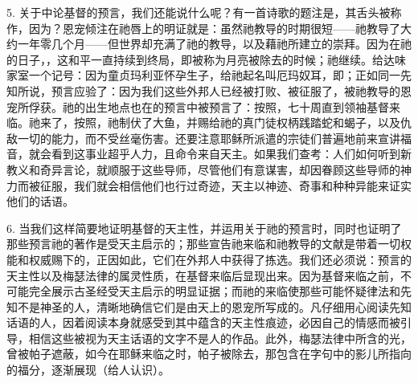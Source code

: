 5. 关于中论基督的预言，我们还能说什么呢？有一首诗歌的题注是，其舌头被称作，因为？恩宠倾注在祂唇上的明证就是：虽然祂教导的时期很短——祂教导了大约一年零几个月——但世界却充满了祂的教导，以及藉祂所建立的崇拜。因为在祂的日子，，这和平一直持续到终局，即被称为月亮被除去的时候；祂继续。给达味家室一个记号：因为童贞玛利亚怀孕生子，给祂起名叫厄玛奴耳，即；正如同一先知所说，预言应验了：因为我们这些外邦人已经被打败、被征服了，被祂教导的恩宠所俘获。祂的出生地点也在的预言中被预言了：按照，七十周直到领袖基督来临。祂来了，按照，祂制伏了大鱼，并赐给祂的真门徒权柄践踏蛇和蝎子，以及仇敌一切的能力，而不受丝毫伤害。还要注意耶稣所派遣的宗徒们普遍地前来宣讲福音，就会看到这事业超乎人力，且命令来自天主。如果我们查考：人们如何听到新教义和奇异言论，就顺服于这些导师，尽管他们有意谋害，却因眷顾这些导师的神力而被征服，我们就会相信他们也行过奇迹，天主以神迹、奇事和种种异能来证实他们的话语。\par

6. 当我们这样简要地证明基督的天主性，并运用关于祂的预言时，同时也证明了那些预言祂的著作是受天主启示的；那些宣告祂来临和祂教导的文献是带着一切权能和权威赐下的，正因如此，它们在外邦人中获得了拣选。我们还必须说：预言的天主性以及梅瑟法律的属灵性质，在基督来临后显现出来。因为基督来临之前，不可能完全展示古圣经受天主启示的明显证据；而祂的来临使那些可能怀疑律法和先知不是神圣的人，清晰地确信它们是由天上的恩宠所写成的。凡仔细用心阅读先知话语的人，因着阅读本身就感受到其中蕴含的天主性痕迹，必因自己的情感而被引导，相信这些被视为天主话语的文字不是人的作品。此外，梅瑟法律中所含的光，曾被帕子遮蔽，如今在耶稣来临之时，帕子被除去，那包含在字句中的影儿所指向的福分，逐渐展现（给人认识）。\par


